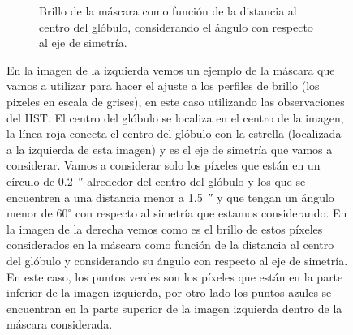 \documentclass{book}
\begin{document}
\begin{figure}[htb]
\begin{subfigure}[b]{0.5\textwidth}
    \caption{Brillo de la máscara como función de la distancia al
      centro del glóbulo, considerando el ángulo con respecto al eje
      de simetría.}
    \label{fig:f2}
  \end{subfigure}
  \caption{En la imagen de la izquierda vemos un ejemplo de la máscara
    que vamos a utilizar para hacer el ajuste a los perfiles de brillo
    (los pixeles en escala de grises), en este caso utilizando las
    observaciones del HST. El centro del glóbulo se localiza en el
    centro de la imagen, la línea roja conecta el centro del glóbulo
    con la estrella (localizada a la izquierda de esta imagen) y es el
    eje de simetría que vamos a considerar. Vamos a considerar solo
    los píxeles que están en un círculo de \SI{0.2}{\arcsecond}
    alrededor del centro del glóbulo y los que se encuentren a una
    distancia menor a \SI{1.5}{\arcsecond} y que tengan un ángulo
    menor de $60^\circ$ con respecto al simetría que estamos considerando.
    En la imagen de la derecha vemos como es el brillo de estos
    píxeles considerados en la máscara como función de la distancia al
    centro del glóbulo y considerando su ángulo con respecto al eje de
    simetría. En este caso, los puntos verdes son los píxeles que
    están en la parte inferior de la imagen izquierda, por otro lado
    los puntos azules se encuentran en la parte superior de la imagen
    izquierda dentro de la máscara considerada.}
  \label{ejemplo mascara}
\end{figure}
\end{document}
